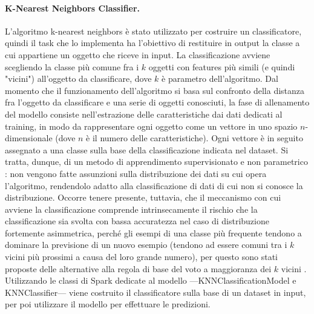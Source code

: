 \documentclass[12pt,a4paper,fleqn,titlepage]{report}
\begin{document}
        \paragraph{K-Nearest Neighbors Classifier.}
        L'algoritmo k-nearest neighbors \cite{cover:1967} è stato utilizzato per costruire un classificatore, quindi il task che lo implementa ha l'obiettivo di restituire in output la classe a cui appartiene un oggetto che riceve in input. La classificazione avviene scegliendo la classe più comune fra i $k$ oggetti con features più simili (e quindi "vicini") all'oggetto da classificare, dove $k$ è parametro dell'algoritmo.
        Dal momento che il funzionamento dell'algoritmo si basa sul confronto della distanza fra l'oggetto da classificare e una serie di oggetti conosciuti, la fase di allenamento del modello consiste nell'estrazione delle caratteristiche dai dati dedicati al training, in modo da rappresentare ogni oggetto come un vettore in uno spazio $n$-dimensionale (dove $n$ è il numero delle caratteristiche). Ogni vettore è in seguito assegnato a una classe sulla base della classificazione indicata nel dataset. Si tratta, dunque, di un metodo di apprendimento supervisionato e non parametrico \cite{siegel:1957}: non vengono fatte assunzioni sulla distribuzione dei dati su cui opera l'algoritmo, rendendolo adatto alla classificazione di dati di cui non si conosce la distribuzione. Occorre tenere presente, tuttavia, che il meccanismo con cui avviene la classificazione comprende intrinsecamente il rischio che la classificazione sia svolta con bassa accuratezza nel caso di distribuzione fortemente asimmetrica, perché gli esempi di una classe più frequente tendono a dominare la previsione di un nuovo esempio (tendono ad essere comuni tra i $k$ vicini più prossimi a causa del loro grande numero), per questo sono stati proposte delle alternative alla regola di base del voto a maggioranza dei $k$ vicini \cite{coomans:1982}.
        Utilizzando le classi di Spark dedicate al modello  —KNNClassificationModel e KNNClassifier— viene costruito il classificatore sulla base di un dataset in input, per poi utilizzare il modello per effettuare le predizioni.
\end{document}
